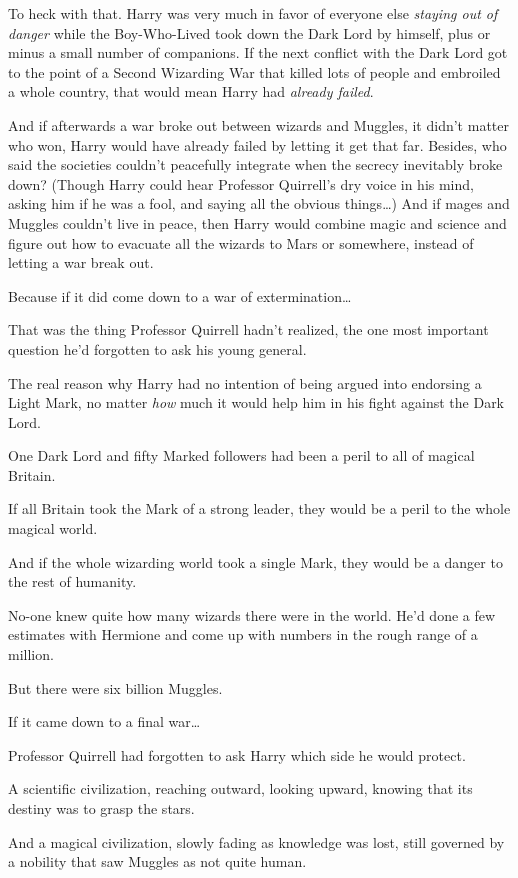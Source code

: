 To heck with that. Harry was very much in favor of everyone else \emph{staying out of danger} while the Boy-Who-Lived took down the Dark Lord by himself, plus or minus a small number of companions. If the next conflict with the Dark Lord got to the point of a Second Wizarding War that killed lots of people and embroiled a whole country, that would mean Harry had \emph{already failed}.

And if afterwards a war broke out between wizards and Muggles, it didn't matter who won, Harry would have already failed by letting it get that far. Besides, who said the societies couldn't peacefully integrate when the secrecy inevitably broke down? (Though Harry could hear Professor Quirrell's dry voice in his mind, asking him if he was a fool, and saying all the obvious things{\ldots}) And if mages and Muggles couldn't live in peace, then Harry would combine magic and science and figure out how to evacuate all the wizards to Mars or somewhere, instead of letting a war break out.

Because if it did come down to a war of extermination{\ldots}

That was the thing Professor Quirrell hadn't realized, the one most important question he'd forgotten to ask his young general.

The real reason why Harry had no intention of being argued into endorsing a Light Mark, no matter \emph{how} much it would help him in his fight against the Dark Lord.

One Dark Lord and fifty Marked followers had been a peril to all of magical Britain.

If all Britain took the Mark of a strong leader, they would be a peril to the whole magical world.

And if the whole wizarding world took a single Mark, they would be a danger to the rest of humanity.

No-one knew quite how many wizards there were in the world. He'd done a few estimates with Hermione and come up with numbers in the rough range of a million.

But there were six billion Muggles.

If it came down to a final war{\ldots}

Professor Quirrell had forgotten to ask Harry which side he would protect.

A scientific civilization, reaching outward, looking upward, knowing that its destiny was to grasp the stars.

And a magical civilization, slowly fading as knowledge was lost, still governed by a nobility that saw Muggles as not quite human.

